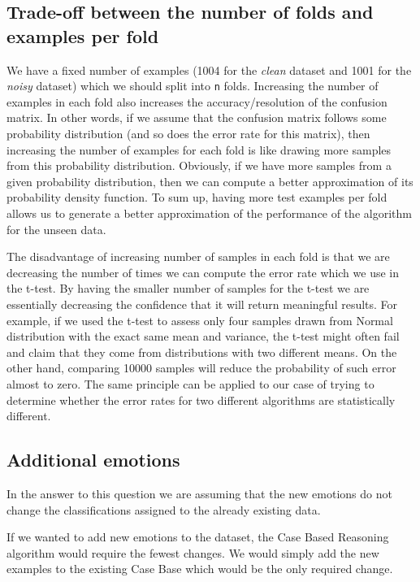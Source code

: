 \documentclass[a4paper]{article}
\begin{document}
\subsection{Trade-off between the number of folds and examples per fold}

We have a fixed number of examples (1004 for the \emph{clean} dataset and 1001 for the \emph{noisy} dataset) which we should split into \texttt{n} folds. Increasing the number of examples in each fold also increases the accuracy/resolution of the confusion matrix. In other words, if we assume that the confusion matrix follows some probability distribution (and so does the error rate for this matrix), then increasing the number of examples for each fold is like drawing more samples from this probability distribution. Obviously, if we have more samples from a given probability distribution, then we can compute a better approximation of its probability density function. To sum up, having more test examples per fold allows us to generate a better approximation of the performance of the algorithm for the unseen data. \medskip

The disadvantage of increasing number of samples in each fold is that we are decreasing the number of times we can compute the error rate which we use in the t-test. By having the smaller number of samples for the t-test we are essentially decreasing the confidence that it will return meaningful results. For example, if we used the t-test to assess only four samples drawn from Normal distribution with the exact same mean and variance, the t-test might often fail and claim that they come from distributions with two different means. On the other hand, comparing 10000 samples will reduce the probability of such error almost to zero. The same principle can be applied to our case of trying to determine whether the error rates for two different algorithms are statistically different.

\subsection{Additional emotions}

In the answer to this question we are assuming that the new emotions do not change the classifications assigned to the already existing data. \medskip

If we wanted to add new emotions to the dataset, the Case Based Reasoning algorithm would require the fewest changes. We would simply add the new examples to the existing Case Base which would be the only required change. \medskip
\end{document}

